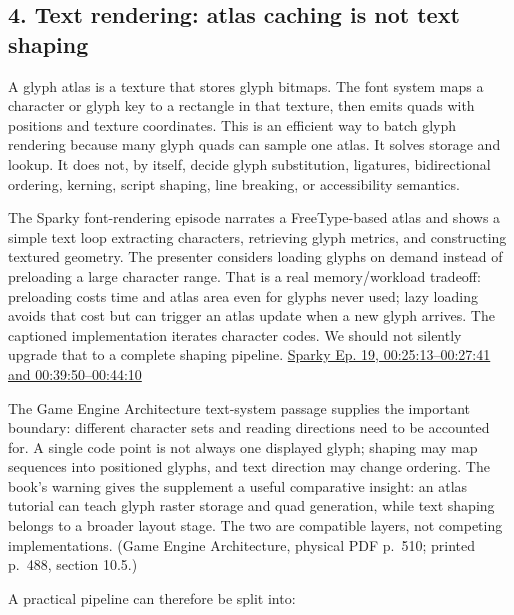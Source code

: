\subsection{4. Text rendering: atlas caching is not text shaping}\label{06-engine-ii-ch041-text-rendering-atlas-caching-is-not-text-shaping}

\hypertarget{06-engine-ii-ch041-text-rendering-atlas-caching-is-not-text-shaping}{}

A glyph atlas is a texture that stores glyph bitmaps. The font system maps a character or glyph key to a rectangle in that texture, then emits quads with positions and texture coordinates. This is an efficient way to batch glyph rendering because many glyph quads can sample one atlas. It solves storage and lookup. It does not, by itself, decide glyph substitution, ligatures, bidirectional ordering, kerning, script shaping, line breaking, or accessibility semantics.

The Sparky font-rendering episode narrates a FreeType-based atlas and shows a simple text loop extracting characters, retrieving glyph metrics, and constructing textured geometry. The presenter considers loading glyphs on demand instead of preloading a large character range. That is a real memory/workload tradeoff: preloading costs time and atlas area even for glyphs never used; lazy loading avoids that cost but can trigger an atlas update when a new glyph arrives. The captioned implementation iterates character codes. We should not silently upgrade that to a complete shaping pipeline. \href{https://www.youtube.com/watch?v=Rsdc6I80aFQ&t=25m13s}{Sparky Ep. 19, 00:25:13--00:27:41 and 00:39:50--00:44:10}

The Game Engine Architecture text-system passage supplies the important boundary: different character sets and reading directions need to be accounted for. A single code point is not always one displayed glyph; shaping may map sequences into positioned glyphs, and text direction may change ordering. The book's warning gives the supplement a useful comparative insight: an atlas tutorial can teach glyph raster storage and quad generation, while text shaping belongs to a broader layout stage. The two are compatible layers, not competing implementations. (Game Engine Architecture, physical PDF p.~510; printed p.~488, section 10.5.)

A practical pipeline can therefore be split into:

